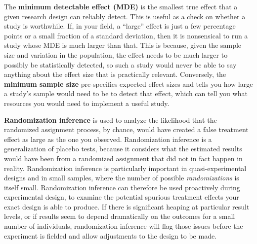 The \textbf{minimum detectable effect (MDE)}
is the smallest true effect that a given research design can reliably detect.
This is useful as a check on whether a study is worthwhile.
If, in your field, a ``large'' effect is just a few percentage points
or a small fraction of a standard deviation,
then it is nonsensical to run a study whose MDE is much larger than that.
This is because, given the sample size and variation in the population,
the effect needs to be much larger to possibly be statistically detected,
so such a study would never be able to say anything about the effect size that is practically relevant.
Conversely, the \textbf{minimum sample size} pre-specifies expected effect sizes
and tells you how large a study's sample would need to be to detect that effect,
which can tell you what resources you would need
to implement a useful study.

\textbf{Randomization inference}
is used to analyze the likelihood
that the randomized assignment process, by chance,
would have created a false treatment effect as large as the one you observed.
Randomization inference is a generalization of placebo tests,
because it considers what the estimated results would have been
from a randomized assignment that did not in fact happen in reality.
Randomization inference is particularly important
in quasi-experimental designs and in small samples,
where the number of possible \textit{randomizations} is itself small.
Randomization inference can therefore be used proactively during experimental design,
to examine the potential spurious treatment effects your exact design is able to produce.
If there is significant heaping at particular result levels,
or if results seem to depend dramatically on the outcomes for a small number of individuals,
randomization inference will flag those issues before the experiment is fielded
and allow adjustments to the design to be made.
